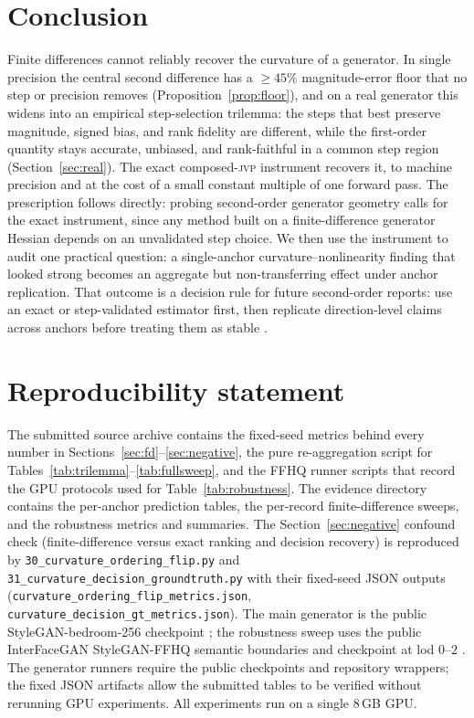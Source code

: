 \documentclass[10pt]{article}
\newcommand{\jvp}{\textsc{jvp}}
\begin{document}
\section{Conclusion}
Finite differences cannot reliably recover the curvature of a generator. In single precision the central
second difference has a $\geq45\%$ magnitude-error floor that no step or precision removes
(Proposition~\ref{prop:floor}), and on a real generator this widens into an empirical step-selection
trilemma: the steps that best preserve magnitude, signed bias, and rank fidelity are different, while the
first-order quantity stays accurate, unbiased, and rank-faithful in a common step region
(Section~\ref{sec:real}). The exact composed-\jvp{} instrument recovers
it, to machine precision and at the cost of a small constant multiple of one forward pass. The
prescription follows directly: probing second-order generator geometry calls for the exact instrument,
since any method built on a finite-difference generator Hessian depends on an
unvalidated step choice. We then use the instrument to audit one practical question: a
single-anchor curvature--nonlinearity finding that looked strong becomes an aggregate but
non-transferring effect under anchor replication. That outcome is a decision rule for future
second-order reports: use an exact or step-validated estimator first, then replicate
direction-level claims across anchors before treating them as stable
\citep{locatello2019,hewitt2019}.

\section*{Reproducibility statement}
The submitted source archive contains the fixed-seed metrics behind every number in
Sections~\ref{sec:fd}--\ref{sec:negative}, the pure re-aggregation script for
Tables~\ref{tab:trilemma}--\ref{tab:fullsweep}, and the FFHQ runner scripts that record the
GPU protocols used for Table~\ref{tab:robustness}. The evidence directory contains the
per-anchor prediction tables, the per-record finite-difference sweeps, and the robustness
metrics and summaries. The Section~\ref{sec:negative} confound check (finite-difference versus
exact ranking and decision recovery) is reproduced by \texttt{30\_curvature\_ordering\_flip.py} and
\texttt{31\_curvature\_decision\_groundtruth.py} with their fixed-seed JSON outputs
(\texttt{curvature\_ordering\_flip\_metrics.json}, \texttt{curvature\_decision\_gt\_metrics.json}). The main generator is the public StyleGAN-bedroom-256 checkpoint
\citep{karras2019}; the robustness sweep uses the public InterFaceGAN StyleGAN-FFHQ semantic
boundaries and checkpoint at lod $0$--$2$ \citep{shen2020}. The generator runners require the
public checkpoints and repository wrappers; the fixed JSON artifacts allow the submitted
tables to be verified without rerunning GPU experiments. All experiments run on a single
8\,GB GPU.
\end{document}
